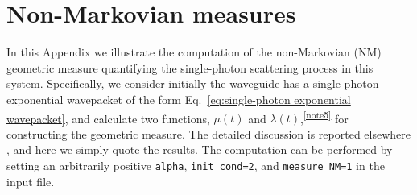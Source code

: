 \documentclass[final,1p,times]{elsarticle}
\begin{document}
\section{Non-Markovian measures}
\label{append: NM}
In this Appendix we illustrate the computation of the non-Markovian (NM) geometric measure \cite{LorenzoPRA13} quantifying the single-photon scattering process in this system. Specifically, we consider initially the waveguide has a single-photon exponential wavepacket of the form Eq.~\eqref{eq:single-photon exponential wavepacket}, and calculate two functions, $\mu(t)$ and $\lambda(t)$,\textsuperscript{\ref{note5}} for constructing the geometric measure. The detailed discussion is reported elsewhere \cite{FangNJP18}, and here we simply quote the results. The computation can be performed by setting an arbitrarily positive \texttt{alpha}, \texttt{init\_cond=2}, and \texttt{measure\_NM=1} in the input file.
\end{document}
